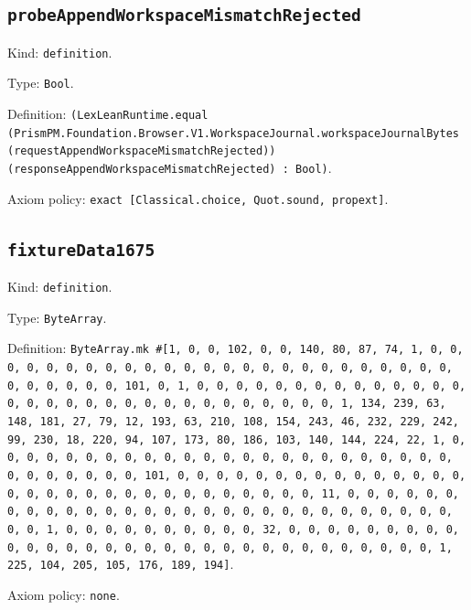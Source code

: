 \documentclass[11pt]{article}
\begin{document}
\subsection*{\texttt{probeAppendWorkspaceMismatchRejected}}
\noindent Kind: \texttt{definition}.\par
\noindent Type: \texttt{Bool}.\par
\noindent Definition: \texttt{(LexLeanRuntime.equal (PrismPM.Foundation.Browser.V1.WorkspaceJournal.workspaceJournalBytes (requestAppendWorkspaceMismatchRejected)) (responseAppendWorkspaceMismatchRejected) : Bool)}.\par
\noindent Axiom policy: \texttt{exact [Classical.choice, Quot.sound, propext]}.\par
\subsection*{\texttt{fixtureData1675}}
\noindent Kind: \texttt{definition}.\par
\noindent Type: \texttt{ByteArray}.\par
\noindent Definition: \texttt{ByteArray.mk \#[1, 0, 0, 102, 0, 0, 140, 80, 87, 74, 1, 0, 0, 0, 0, 0, 0, 0, 0, 0, 0, 0, 0, 0, 0, 0, 0, 0, 0, 0, 0, 0, 0, 0, 0, 0, 0, 0, 0, 0, 0, 0, 101, 0, 1, 0, 0, 0, 0, 0, 0, 0, 0, 0, 0, 0, 0, 0, 0, 0, 0, 0, 0, 0, 0, 0, 0, 0, 0, 0, 0, 0, 0, 0, 0, 0, 1, 134, 239, 63, 148, 181, 27, 79, 12, 193, 63, 210, 108, 154, 243, 46, 232, 229, 242, 99, 230, 18, 220, 94, 107, 173, 80, 186, 103, 140, 144, 224, 22, 1, 0, 0, 0, 0, 0, 0, 0, 0, 0, 0, 0, 0, 0, 0, 0, 0, 0, 0, 0, 0, 0, 0, 0, 0, 0, 0, 0, 0, 0, 0, 0, 101, 0, 0, 0, 0, 0, 0, 0, 0, 0, 0, 0, 0, 0, 0, 0, 0, 0, 0, 0, 0, 0, 0, 0, 0, 0, 0, 0, 0, 0, 0, 0, 11, 0, 0, 0, 0, 0, 0, 0, 0, 0, 0, 0, 0, 0, 0, 0, 0, 0, 0, 0, 0, 0, 0, 0, 0, 0, 0, 0, 0, 0, 0, 0, 1, 0, 0, 0, 0, 0, 0, 0, 0, 0, 0, 32, 0, 0, 0, 0, 0, 0, 0, 0, 0, 0, 0, 0, 0, 0, 0, 0, 0, 0, 0, 0, 0, 0, 0, 0, 0, 0, 0, 0, 0, 0, 0, 1, 225, 104, 205, 105, 176, 189, 194]}.\par
\noindent Axiom policy: \texttt{none}.\par
\end{document}
